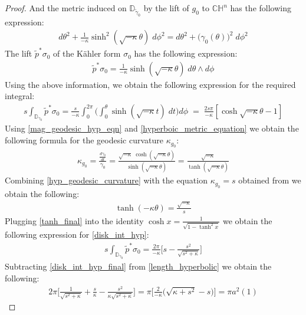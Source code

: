 \documentclass[11pt]{amsart}
\theoremstyle{plain}
\theoremstyle{definition}
\theoremstyle{remark}
\begin{document}
\begin{proof}
And the metric induced on $\mathbb{D}_{\tilde \gamma_0}$ by the lift of $g_0$ to $\mathbb{CH}^n$ has the following expression:
\begin{align}\label{hyperboic_metric_equation}
    d\theta^2 + \frac{1}{-\kappa} \sinh^2(\sqrt{-\kappa}\theta) \; d\phi^2 =d\theta^2 + \big(\gamma_0(\theta)\big)^2 \; d\phi^2
\end{align}
The lift $\tilde p^* \sigma_0$ of the K\"ahler form $\sigma_0$ has the following expression:
\begin{align}\label{kahler_form_hyp_eqn}
    \tilde p^* \sigma_0 = \frac{1}{-\kappa} \sinh{(\sqrt{-\kappa}\theta)} \; d\theta \wedge d\phi
\end{align}
Using the above information, we obtain the following expression for the required integral: 
\begin{align}\label{disk_int_hyp}
   s\int_{\mathbb{D}_{\gamma_0}} \tilde p^*\sigma_0  = \frac{s}{-\kappa}\int^{2\pi}_0 \Big( \int^{\theta}_0 \sinh(\sqrt{-\kappa}t)\; dt \Big)d\phi \; = \; \frac{2s\pi}{-\kappa}[\cosh{\sqrt{-\kappa}\theta}-1] 
\end{align}
Using \eqref{mag_geodesic_hyp_eqn} and \eqref{hyperboic_metric_equation} we obtain the following formula for the geodesic curvature $\kappa_{g_0}$:
\begin{align}\label{hyp_geodesic_curvature}
    \kappa_{g_0} = \frac{\frac{d \gamma_0}{dt}}{\gamma_0} = \frac{\sqrt{-\kappa} \;\cosh(\sqrt{-\kappa}\theta)}{\sinh(\sqrt{-\kappa} \theta)} = \frac{\sqrt{-\kappa}}{\tanh{(\sqrt{-\kappa} \theta)}}
\end{align}
Combining \eqref{hyp_geodesic_curvature} with the equation $\kappa_{g_0} = s$ obtained from \cite[(10)]{johanna_projective} we obtain the following:
\begin{align}\label{tanh_final}
    \tanh{(-\kappa \theta)} = \frac{\sqrt{-\kappa} }{s}
\end{align}
Plugging \eqref{tanh_final} into  the identity $\cosh x= \frac{1}{\sqrt{1-\tanh^2x}}$ we obtain the following expression for  \eqref{disk_int_hyp}:
\begin{align}\label{disk_int_hyp_final}
s\int_{\mathbb{D}_{\gamma_0}} \tilde p^*\sigma_0 =  \frac{2\pi}{-\kappa}  \Bigg[s- \frac{s^2}{\sqrt{s^2+\kappa}}  \Bigg]
\end{align}
Subtracting \eqref{disk_int_hyp_final} from \eqref{length_hyperbolic} we obtain the following:
\begin{align}
    2\pi\Bigg[ \frac{1}{\sqrt{s^2+\kappa}} + \frac{s}{\kappa} - \frac{s^2}{\kappa\sqrt{s^2+\kappa}} \Bigg] = \pi \Bigg[ \frac{2}{-\kappa}\Big( \sqrt{\kappa +s^2} -s \Big)\Bigg] = \pi a^2(1)

\end{align}
\end{proof}
\end{document}
